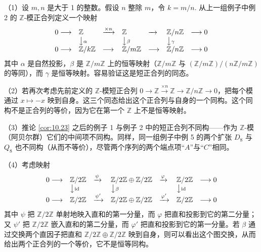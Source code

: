 \begin{example}
（1）设 \(m, n\) 是大于 1 的整数。假设 \(n\) 整除 \(m\)，令 \(k = m/n\). 从上一组例子中例 2 的 \(\mathbb{Z}\)-模正合列定义一个映射
\[
\begin{array}{lllllll}
0 \longrightarrow & \mathbb{Z} & \xrightarrow{\times n} & \mathbb{Z} & \xrightarrow{\ \ } & \mathbb{Z}/n\mathbb{Z} & \longrightarrow 0\\
& \big\downarrow{\scriptstyle\alpha} & & \big\downarrow{\scriptstyle\beta} & & \big\downarrow{\scriptstyle\gamma} & \\
0 \longrightarrow & \mathbb{Z}/k\mathbb{Z} & \longrightarrow & \mathbb{Z}/m\mathbb{Z} & \longrightarrow & \mathbb{Z}/n\mathbb{Z} & \longrightarrow 0
\end{array}
\]
其中 \(\alpha\) 是自然投影，\(\beta\) 是 \( \mathbb{Z}/m\mathbb{Z}\) 上的恒等映射（\(\mathbb{Z}/m\mathbb{Z}\) 与 \((\mathbb{Z}/m\mathbb{Z})/(n\mathbb{Z}/m\mathbb{Z})\) 的等同），而 \(\gamma\) 是恒等映射。容易验证这是短正合列的同态。

（2）若再次考虑先前定义的 \(\mathbb{Z}\)-模短正合列 \(0 \to \mathbb{Z} \xrightarrow{\times n} \mathbb{Z} \to \mathbb{Z}/n\mathbb{Z} \to 0\)，把每个模通过 \(x \mapsto -x\) 映到自身。这三个同态给出这个正合列与自身的一个同构。这个同构不是正合列的等价，因为它在第一个 \(\mathbb{Z}\) 上不是恒等映射。

（3）推论 \ref{cor:10.23} 之后的例子 1 与例子 2 中的短正合列不同构——作为 \(\mathbb{Z}\)-模（阿贝尔群）它们的中间项不同构。同样，同一组例子中例 5 的两个扩张 \(D_8\) 与 \(Q_8\) 也不同构（从而不等价），尽管两个序列的两个端点项“\(A\)”与“\(C\)”相同。

（4）考虑映射
\[
\begin{array}{lllllll}
0 \longrightarrow & \mathbb{Z}/2\mathbb{Z} & \xrightarrow{\psi} & \mathbb{Z}/2\mathbb{Z} \oplus \mathbb{Z}/2\mathbb{Z} & \xrightarrow{\varphi} & \mathbb{Z}/2\mathbb{Z} & \longrightarrow 0\\
& \big\downarrow{\scriptstyle\mathrm{id}} & & \big\downarrow{\scriptstyle\beta} & & \big\downarrow{\scriptstyle\mathrm{id}} & \\
0 \longrightarrow & \mathbb{Z}/2\mathbb{Z} & \xrightarrow{\psi'} & \mathbb{Z}/2\mathbb{Z} \oplus \mathbb{Z}/2\mathbb{Z} & \xrightarrow{\varphi'} & \mathbb{Z}/2\mathbb{Z} & \longrightarrow 0
\end{array}
\]
其中 \(\psi\) 把 \(\mathbb{Z}/2\mathbb{Z}\) 单射地映入直和的第一分量，而 \(\varphi\) 把直和投影到它的第二分量；又 \(\psi'\) 把 \(\mathbb{Z}/2\mathbb{Z}\) 嵌入直和的第二分量，而 \(\varphi'\) 把直和投影到它的第一分量。若 \(\beta\) 通过交换两个直因子把直和 \(\mathbb{Z}/2\mathbb{Z} \oplus \mathbb{Z}/2\mathbb{Z}\) 映到自身，则可以看出这个图交换，从而给出两个正合列的一个等价，它不是恒等同构。


\end{example}
